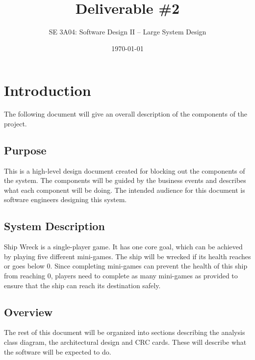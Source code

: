 \documentclass[]{article}
\title{Deliverable \#2}
\author{SE 3A04: Software Design II -- Large System Design}
\date{\today}
\begin{document}
\maketitle	

\section{Introduction}
\label{sec:introduction}

The following document will give an overall description of the components of the project.

\subsection{Purpose}
This is a high-level design document created for blocking out the components of the system. The components will be guided by the business events and describes what each component will be doing. The intended audience for this document is software engineers designing this system.

\subsection{System Description}
\label{sub:system_description}
Ship Wreck is a single-player game. It has one core goal, which can be achieved by playing five different mini-games. The ship will be wrecked if its health reaches or goes below 0. Since completing mini-games can prevent the health of this ship from reaching 0, players need to complete as many mini-games as provided to ensure that the ship can reach its destination safely.

\subsection{Overview}
\label{sub:overview}
The rest of this document will be organized into sections describing the analysis class diagram, the architectural design and CRC cards. These will describe what the software will be expected to do.

\end{document}
